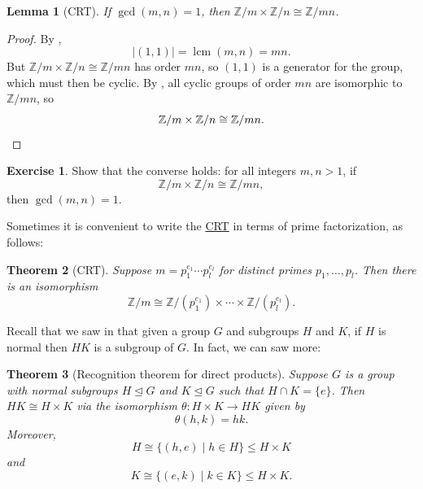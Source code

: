 \documentclass[12pt]{report}
\newtheorem{theorem}{Theorem}[chapter]
\newtheorem{lemma}[theorem]{Lemma}
\numberwithin{equation}{section}
\numberwithin{theorem}{chapter}
\theoremstyle{definition}
\newtheorem{exercise}{Exercise}
\newtheorem*{basic properties}{Basic Properties}
\newtheorem*{Important Remark}{Important Remark}
\newcommand{\Z}{\mathbb{Z}}
\DeclareMathOperator{\lcm}{lcm}
\def\norm{\mathrel{\unlhd}}
\begin{document}
\begin{lemma}[CRT]\label{CRT}
If $\gcd(m,n)=1$, then $\Z/m \times \Z/n\cong \Z/mn$. 
\end{lemma}


\begin{proof}
By ,
$$|(1,1)|=\lcm(m,n)=mn.$$ 
But $\Z/m\times \Z/n\cong \Z/mn$ has order $mn$, so $(1,1)$ is a generator for the group, which must then be cyclic. By , all cyclic groups of order $mn$ are isomorphic to $\Z/mn$, so
$$\Z/m\times \Z/n\cong \Z/mn.\qedhere$$
\end{proof}


\begin{exercise}\label{exercise CRT converse}
	Show that the converse holds: for all integers $m, n > 1$, if
	$$\Z/m\times \Z/n\cong \Z/mn,$$ 
	then $\gcd(m,n) = 1$.
\end{exercise}



Sometimes it is convenient to write the \hyperref[CRT]{CRT} in terms of prime factorization, as follows:

\begin{theorem}[CRT]\label{CRT}
Suppose $m = p_1^{e_1} \cdots p_l^{e_l}$ for distinct primes $p_1, \dots, p_l$. Then there is an isomorphism
$$\Z/m \cong \Z/(p_1^{e_1}) \times \cdots \times \Z/(p_l^{e_l}).$$
\end{theorem}


Recall that we saw in  that given a group $G$ and subgroups $H$ and $K$, if $H$ is normal then $HK$ is a subgroup of $G$. In fact, we can saw more:


\begin{theorem}[Recognition theorem for direct products]\label{direct product recognition}
Suppose $G$ is a group with normal subgroups $H \norm G$ and $K \norm G$ such that $H\cap K=\{e\}$. Then $HK\cong H\times K$ via the isomorphism $\theta\!: H \times K \to HK$ given by
$$\theta(h,k) = hk.$$ 
Moreover, 
$$H \cong \{(h,e)\mid h\in H\}\leq H\times K$$
and 
$$K\cong \{(e,k)\mid k\in K\}\leq H\times K.$$
\end{theorem}
\end{document}
